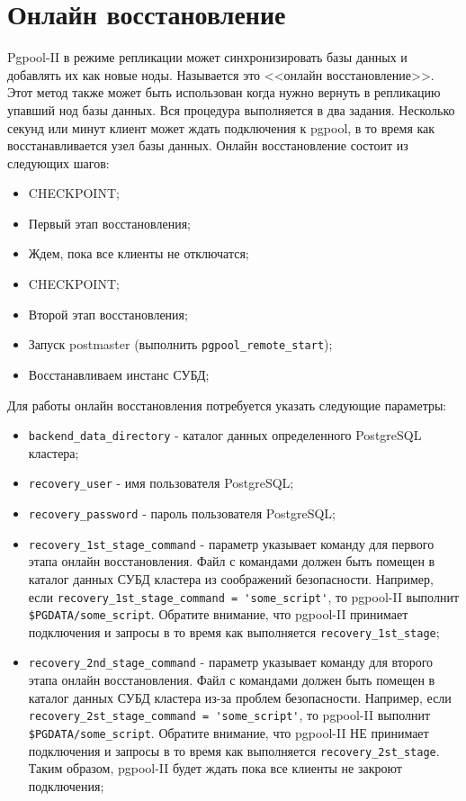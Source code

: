\section{Онлайн восстановление}

Pgpool-II в режиме репликации может синхронизировать базы данных и добавлять их как новые ноды. Называется это <<онлайн восстановление>>. Этот метод также может быть использован когда нужно вернуть в репликацию упавший нод базы данных. Вся процедура выполняется в два задания. Несколько секунд или минут клиент может ждать подключения к pgpool, в то время как восстанавливается узел базы данных. Онлайн восстановление состоит из следующих шагов:

\begin{itemize}
  \item CHECKPOINT;
  \item Первый этап восстановления;
  \item Ждем, пока все клиенты не отключатся;
  \item CHECKPOINT;
  \item Второй этап восстановления;
  \item Запуск postmaster (выполнить \lstinline!pgpool_remote_start!);
  \item Восстанавливаем инстанс СУБД;
\end{itemize}

Для работы онлайн восстановления потребуется указать следующие параметры:

\begin{itemize}

  \item \lstinline!backend_data_directory! - каталог данных определенного PostgreSQL кластера;
  \item \lstinline!recovery_user! - имя пользователя PostgreSQL;
  \item \lstinline!recovery_password! - пароль пользователя PostgreSQL;
  \item \lstinline!recovery_1st_stage_command! - параметр указывает команду для первого этапа онлайн восстановления. Файл с командами должен быть помещен в каталог данных СУБД кластера из соображений безопасности. Например, если \lstinline!recovery_1st_stage_command = 'some_script'!, то pgpool-II выполнит \lstinline!$PGDATA/some_script!. Обратите внимание, что pgpool-II принимает подключения и запросы в то время как выполняется \lstinline!recovery_1st_stage!;
  \item \lstinline!recovery_2nd_stage_command! - параметр указывает команду для второго этапа онлайн восстановления. Файл с командами должен быть помещен в каталог данных СУБД кластера из-за проблем безопасности. Например, если \lstinline!recovery_2st_stage_command = 'some_script'!, то pgpool-II выполнит \lstinline!$PGDATA/some_script!. Обратите внимание, что pgpool-II НЕ принимает подключения и запросы в то время как выполняется \lstinline!recovery_2st_stage!. Таким образом, pgpool-II будет ждать пока все клиенты не закроют подключения;

\end{itemize}




